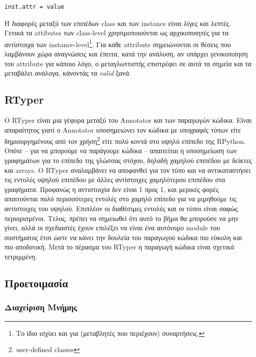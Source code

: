 \begin{verbatim}
inst.attr = value
\end{verbatim}

Η διαφορές μεταξύ των επιπέδων class και των instance είναι λίγες και λεπτές.
Γενικά τα attibutes των class-level χρησιμοποιούνται ως αρχικοποιητές για τα
αντίστοιχα των instance-level\footnote{Το ίδιο ισχύει και για (μεταβλητές που
περιέχουν) συναρτήσεις.}. Για κάθε attribute σημειώνονται οι θέσεις που
λαμβάνουν χώρα αναγνώσεις και έπειτα, κατά την ανάλυση, αν υπάρχει γενικοποίηση
του attribute για κάποιο λόγο, ο μεταγλωττιστής επιστρέφει σε αυτά τα σημεία και
τα μεταβάλει ανάλογα, κάνοντάς τα \textit{valid} ξανά.

\subsection{RTyper}

Ο RTyper είναι μια γέφυρα μεταξύ του Annotator και των παραγωγών κώδικα. Είναι
απαραίτητος γιατί ο Annotator υποσημειώνει τον κώδικα με \textit{υπογραφές}
τύπων είτε δημιουργημένους από τον χρήση\footnote{user-defined classes} είτε
πολύ κοντά στο υψηλό επίπεδο της RPython. Οπότε – για να μπορούμε να παράγουμε
κώδικα – απαιτείται η υποσημείωση των γραφημάτων για το επίπεδο της γλώσσας
στόχου, δηλαδή χαμηλού επιπέδου με δείκτες και arrays. Ο RTyper αναλαμβάνει να
αποφανθεί για τον τύπο και να αντικαταστήσει τις εντολές υψηλού επιπέδου με
άλλες αντίστοιχες χαμηλότερου επιπέδου στα γραφήματα. Προφανώς η αντιστοιχία
δεν είναι 1 προς 1, και μερικές φορές απαιτούνται πολύ περισσότερες εντολές στο
χαμηλό επίπεδο για να μιμηθούμε τις αντίστοιχες του υψηλού. Επιπλέον οι
διαθέσιμες εντολές και οι τύποι είναι σαφώς περιορισμένοι. Τελος, πρέπει να
σημειωθεί ότι αυτό το βήμα θα μπορούσε να μην γίνει, αλλά οι σχεδιαστές έχουν
επιλέξει να είναι ένα αυτόνομο module του συστήματος έτσι ώστε να κάνει την
δουλεία του παραγωγού κώδικα πιο εύκολη και πιο αποδοτική. Μετά το πέρασμα του
RTyper η παραγωγή κώδικα είναι σχετικά τετριμμένη.


\subsection{Προετοιμασία}

\subsubsection{Διαχείριση Μνήμης}

